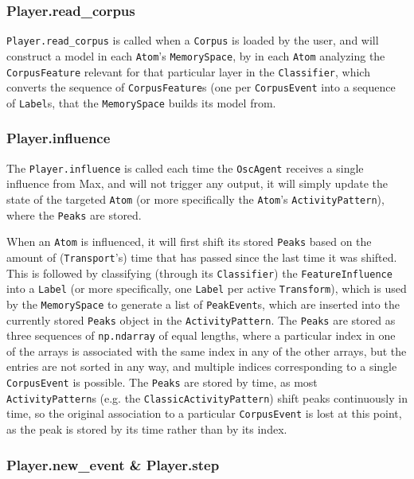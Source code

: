 \subsubsection{Player.read\_corpus}

\texttt{Player.read\_corpus} is called when a \texttt{Corpus} is loaded by the user, and will construct a model in each \texttt{Atom}'s \texttt{MemorySpace}, by in each \texttt{Atom} analyzing the \texttt{CorpusFeature} relevant for that particular layer in the \texttt{Classifier}, which converts the sequence of \texttt{CorpusFeature}s (one per \texttt{CorpusEvent} into a sequence of \texttt{Label}s, that the \texttt{MemorySpace} builds its model from.

\subsubsection{Player.influence}
The \texttt{Player.influence} is called each time the \texttt{OscAgent} receives a single influence from Max, and will not trigger any output, it will simply update the state of the targeted \texttt{Atom} (or more specifically the \texttt{Atom}'s \texttt{ActivityPattern}), where the \texttt{Peaks} are stored. 

When an \texttt{Atom} is influenced, it will first shift its stored \texttt{Peaks} based on the amount of (\texttt{Transport}'s) time that has passed since the last time it was shifted. This is followed by classifying (through its \texttt{Classifier}) the \texttt{FeatureInfluence} into a \texttt{Label} (or more specifically, one \texttt{Label} per active \texttt{Transform}), which is used by the \texttt{MemorySpace} to generate a list of \texttt{PeakEvent}s, which are inserted into the currently stored \texttt{Peaks} object in the \texttt{ActivityPattern}. The \texttt{Peaks} are stored as three sequences of \texttt{np.ndarray} of equal lengths, where a particular index in one of the arrays is associated with the same index in any of the other arrays, but the entries are not sorted in any way, and multiple indices corresponding to a single \texttt{CorpusEvent} is possible. The \texttt{Peaks} are stored by time, as most \texttt{ActivityPattern}s (e.g. the \texttt{ClassicActivityPattern}) shift peaks continuously in time, so the original association to a particular \texttt{CorpusEvent} is lost at this point, as the peak is stored by its time rather than by its index.

\subsubsection{Player.new\_event \& Player.step}




